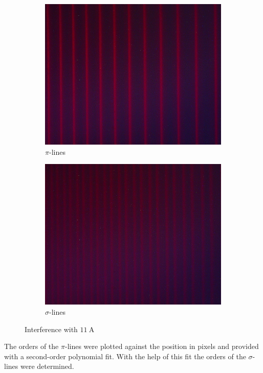 \begin{figure}[ht]
\centering
\begin{subfigure}{.24\textwidth}
\centering
\includegraphics[scale=.115]{images//pi.jpg}
\caption{$\pi$-lines}
\end{subfigure}
\begin{subfigure}{.24\textwidth}
\centering
\includegraphics[scale=.115]{images//sigma.jpg}
\caption{$\sigma$-lines}
\end{subfigure}
\caption{Interference with $\SI{11}{\ampere}$}
\label{fig:pisigma}
\end{figure}
The orders of the $\pi$-lines were plotted against the position in pixels and provided with a second-order polynomial fit.
With the help of this fit the orders of the $\sigma$-lines were determined.\\

